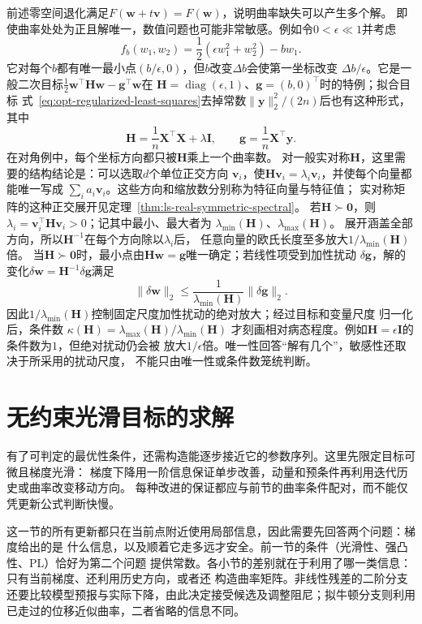 前述零空间退化满足$F(\bm w+t\bm v)=F(\bm w)$，说明曲率缺失可以产生多个解。
即使曲率处处为正且解唯一，数值问题也可能非常敏感。例如令$0<\epsilon\ll1$并考虑
\[
  f_b(w_1,w_2)=\frac12(\epsilon w_1^2+w_2^2)-bw_1.
\]
它对每个$b$都有唯一最小点$(b/\epsilon,0)$，但$b$改变$\Delta b$会使第一坐标改变
$\Delta b/\epsilon$。它是一般二次目标$\frac12\bm w^\top\bm H\bm w-\bm g^\top\bm w$在
$\bm H=\operatorname{diag}(\epsilon,1)$、$\bm g=(b,0)^\top$时的特例；拟合目标
式~\eqref{eq:opt-regularized-least-squares}去掉常数$\lVert\bm y\rVert_2^2/(2n)$后也有这种形式，其中
\[
  \bm{H}=\frac{1}{n}\bm{X}^{\top}\bm{X}+\lambda\bm{I},\qquad
  \bm g=\frac1n\bm X^\top\bm y.
\]
在对角例中，每个坐标方向都只被$\bm H$乘上一个曲率数。
对一般实对称$\bm H$，这里需要的结构结论是：可以选取$d$个单位正交方向
$\bm v_i$，使$\bm H\bm v_i=\lambda_i\bm v_i$，并使每个向量都能唯一写成
$\sum_i a_i\bm v_i$。这些方向和缩放数分别称为特征向量与特征值；
实对称矩阵的这种正交展开见定理~\ref{thm:ls-real-symmetric-spectral}。
若$\bm H\succ\bm0$，则
$\lambda_i=\bm v_i^\top\bm H\bm v_i>0$；记其中最小、最大者为
$\lambda_{\min}(\bm H)$、$\lambda_{\max}(\bm H)$。
展开涵盖全部方向，所以$\bm H^{-1}$在每个方向除以$\lambda_i$后，
任意向量的欧氏长度至多放大$1/\lambda_{\min}(\bm H)$倍。
当$\bm{H}\succ\bm{0}$时，最小点由$\bm H\bm w=\bm g$唯一确定；若线性项受到加性扰动
$\delta\bm{g}$，解的变化$\delta\bm w=\bm H^{-1}\delta\bm g$满足
\[
  \lVert\delta\bm{w}\rVert_2
  \leq
  \frac{1}{\lambda_{\min}(\bm{H})}
  \lVert\delta\bm{g}\rVert_2.
\]
因此$1/\lambda_{\min}(\bm{H})$控制固定尺度加性扰动的绝对放大；经过目标和变量尺度
归一化后，条件数
$\kappa(\bm{H})=\lambda_{\max}(\bm{H})/\lambda_{\min}(\bm{H})$
才刻画相对病态程度。例如$\bm{H}=\epsilon\bm{I}$的条件数为$1$，但绝对扰动仍会被
放大$1/\epsilon$倍。唯一性回答“解有几个”，敏感性还取决于所采用的扰动尺度，
不能只由唯一性或条件数笼统判断。

\section{无约束光滑目标的求解}
\label{sec:opt-smooth-iterative-methods}

有了可判定的最优性条件，还需构造能逐步接近它的参数序列。这里先限定目标可微且梯度光滑：
梯度下降用一阶信息保证单步改善，动量和预条件再利用迭代历史或曲率改变移动方向。
每种改进的保证都应与前节的曲率条件配对，而不能仅凭更新公式判断快慢。

这一节的所有更新都只在当前点附近使用局部信息，因此需要先回答两个问题：梯度给出的是
什么信息，以及顺着它走多远才安全。前一节的条件（光滑性、强凸性、PL）恰好为第二个问题
提供常数。各小节的差别就在于利用了哪一类信息：只有当前梯度、还利用历史方向，或者还
构造曲率矩阵。非线性残差的二阶分支还要比较模型预报与实际下降，由此决定接受候选及调整阻尼；拟牛顿分支则利用已走过的位移近似曲率，二者省略的信息不同。

